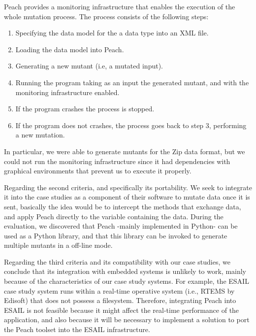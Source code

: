 Peach provides a monitoring infrastructure that enables the execution of the whole mutation process. The process consists of the following steps:
\begin{enumerate}
	\item Specifying the data model for the a data type into an XML file.
	\item Loading the data model into Peach.
	\item Generating a new mutant (i.e, a mutated input).
	\item Running the program taking as an input the generated mutant, and with the monitoring infrastructure enabled.
	\item If the program crashes the process is stopped.
	\item If the program does not crashes, the process goes back to step 3, performing a new mutation.
\end{enumerate}

In particular, we were able to generate mutants for the Zip data format, but we could not run the monitoring infrastructure since it had dependencies with graphical environments that prevent us to execute it properly.

Regarding the second criteria, and specifically its portability. We seek to integrate it into the case studies as a component of their software to mutate data once it is sent, basically the idea would be to intercept the methods that exchange data, and apply Peach directly to the variable containing the data.
During the evaluation, we discovered that Peach -mainly implemented in Python- can be used as a Python library, and that this library can be invoked to generate multiple mutants in a off-line mode.


Regarding the third criteria and its compatibility with our case studies, we conclude that its integration with embedded systems is unlikely to work, mainly because of the characteristics of our case study systems.
For example, the ESAIL case study system runs within a real-time operative system (i.e., RTEMS by Edisoft) that does not possess a filesystem. Therefore, integrating Peach into ESAIL is not feasible because it might affect the real-time performance of the application, and also because it will be necessary to implement a solution to port the Peach toolset into the ESAIL infrastructure.
